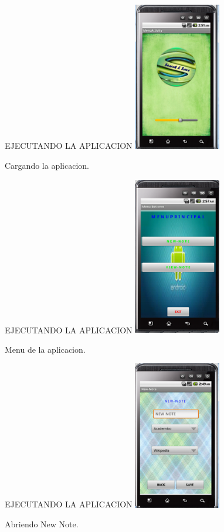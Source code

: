 \documentclass{beamer}
\begin{document}
	\begin{frame}{EJECUTANDO LA APLICACION}
		\centering
  		\includegraphics[totalheight=2in,width=1.5in]{cargando}
  		\begin{block}{}
  		Cargando la aplicacion.
  		\end{block}
 	\end{frame}

	\begin{frame}{EJECUTANDO LA APLICACION}
		\centering
  		\includegraphics[totalheight=2in,width=1.5in]{menuapp}	
  		\begin{block}{}
  		Menu de la aplicacion.
  		\end{block}
 	\end{frame}
 	\begin{frame}{EJECUTANDO LA APLICACION}
		\centering
  		\includegraphics[totalheight=2in,width=1.5in]{notas}
  		\begin{block}{}
  		Abriendo New Note.
  		\end{block}	
 	\end{frame}
 	
\end{document}

